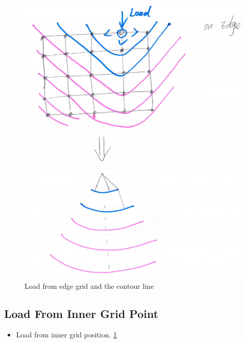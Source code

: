 \documentclass[preprint,12pt]{elsarticle}
\begin{document}
\begin{figure}[h]
\centering\includegraphics[width=1\linewidth]{edge1}
\caption{Load from edge grid and the contour line }
\label{edge1}
\end{figure}



\subsection{Load From Inner Grid Point}
\begin{itemize}
\item Load from inner grid position. \ref{edge1}
\end{itemize}
\end{document}
